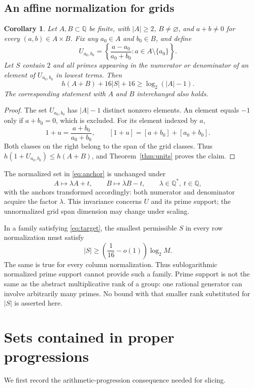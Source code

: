 \documentclass[11pt,letterpaper]{article}
\newtheorem{corollary}[theorem]{Corollary}
\theoremstyle{remark}\newtheorem{remark}[theorem]{Remark}
\newcommand{\Q}{\mathbb Q}
\begin{document}
\subsection{An affine normalization for grids}
\begin{corollary}\label{cor:anchor}
Let $A,B\subset\Q$ be finite, with $|A|\ge2$, $B\ne\varnothing$, and $a+b\ne0$ for every $(a,b)\in A\times B$. Fix any $a_0\in A$ and $b_0\in B$, and define
\begin{equation}\label{eq:anchor}
 U_{a_0,b_0}=\left\{\frac{a-a_0}{a_0+b_0}:a\in A\setminus\{a_0\}\right\}.
\end{equation}
Let $S$ contain $2$ and all primes appearing in the numerator or denominator of an element of $U_{a_0,b_0}$ in lowest terms. Then
\begin{equation}\label{eq:anchorbound}
 h(A+B)+16|S|+16\ge\log_2(|A|-1).
\end{equation}
The corresponding statement with $A$ and $B$ interchanged also holds.
\end{corollary}
\begin{proof}
The set $U_{a_0,b_0}$ has $|A|-1$ distinct nonzero elements. An element equals $-1$ only if $a+b_0=0$, which is excluded. For its element indexed by $a$,
\[
 1+u=\frac{a+b_0}{a_0+b_0},\qquad
 [1+u]=[a+b_0]+[a_0+b_0].
\]
Both classes on the right belong to the span of the grid classes. Thus $h(1+U_{a_0,b_0})\le h(A+B)$, and Theorem~\ref{thm:units} proves the claim.
\end{proof}

The normalized set in \eqref{eq:anchor} is unchanged under
\[
 A\mapsto\lambda A+t,\qquad B\mapsto\lambda B-t,
 \qquad \lambda\in\Q^*,\ t\in\Q,
\]
with the anchors transformed accordingly: both numerator and denominator acquire the factor $\lambda$. This invariance concerns $U$ and its prime support; the unnormalized grid span dimension may change under scaling.

In a family satisfying \eqref{eq:target}, the smallest permissible $S$ in every row normalization must satisfy
\[
 |S|\ge\left(\frac1{16}-o(1)\right)\log_2 M.
\]
The same is true for every column normalization. Thus sublogarithmic normalized prime support cannot provide such a family. Prime support is not the same as the abstract multiplicative rank of a group: one rational generator can involve arbitrarily many primes. No bound with that smaller rank substituted for $|S|$ is asserted here.

\section{Sets contained in proper progressions}
We first record the arithmetic-progression consequence needed for slicing.
\end{document}
